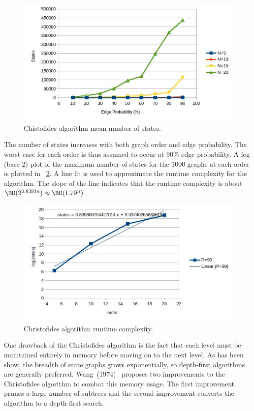 \begin{figure}[H]
  \centering
  \includegraphics[width=5in]{christofides_states}
  \caption{Chistofides algorithm mean number of states.}
  \label{fig:cfstates}
\end{figure}

The number of states increases with both graph order and edge probability.  The worst case for each order is thus
assumed to occur at \(90\%\) edge probability.  A log (base 2) plot of the maximum number of states for the
\(1000\) graphs at each order is plotted in \figurename~\ref{fig:cfruntime}.  A line fit is used to approximate the
runtime complexity for the algorithm.  The slope of the line indicates that the runtime complexity is about
\(\BO(2^{0.8393n})\approx\BO(1.79^n)\).

\begin{figure}[H]
  \centering
  \includegraphics[width=5in]{christofides_runtime}
  \caption{Christofides algorithm runtime complexity.}
  \label{fig:cfruntime}
\end{figure}

One drawback of the Christofides algorithm is the fact that each level must be maintained entirely in memory before
moving on to the next level.  As has been show, the breadth of state graphs grows exponentially, so depth-first
algorithms are generally preferred.  Wang~(1974)~\cite{wang} proposes two improvements to the Christofides
algorithm to combat this memory usage.  The first improvement prunes a large number of subtrees and the second
improvement converts the algorithm to a depth-first search.

